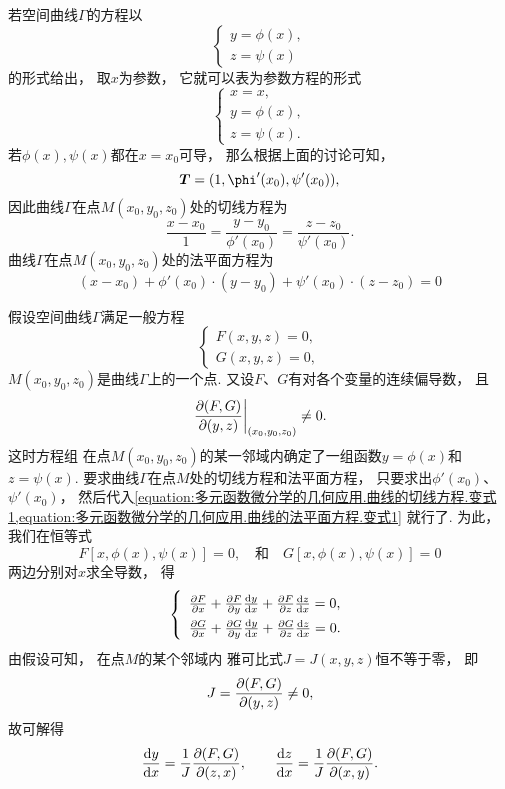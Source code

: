 若空间曲线\(\Gamma\)的方程以\[
	\left\{ \begin{array}{l}
		y = \phi(x), \\
		z = \psi(x)
	\end{array} \right.
\]的形式给出，
取\(x\)为参数，
它就可以表为参数方程的形式\[
	\left\{ \begin{array}{l}
		x = x, \\
		y = \phi(x), \\
		z = \psi(x).
	\end{array} \right.
\]
若\(\phi(x),\psi(x)\)都在\(x=x_0\)可导，
那么根据上面的讨论可知，\[
	\vb{T} = (1,\phi'(x_0),\psi'(x_0)),
\]
因此曲线\(\Gamma\)在点\(M(x_0,y_0,z_0)\)处的切线方程为
\begin{equation}\label{equation:多元函数微分学的几何应用.曲线的切线方程.变式1}
	\frac{x-x_0}{1}
	=\frac{y-y_0}{\phi'(x_0)}
	=\frac{z-z_0}{\psi'(x_0)}.
\end{equation}
曲线\(\Gamma\)在点\(M(x_0,y_0,z_0)\)处的法平面方程为
\begin{equation}\label{equation:多元函数微分学的几何应用.曲线的法平面方程.变式1}
	(x-x_0) + \phi'(x_0) \cdot (y-y_0) + \psi'(x_0) \cdot (z-z_0) = 0
\end{equation}

假设空间曲线\(\Gamma\)满足一般方程 
\[
	\left\{ \begin{array}{l}
		F(x,y,z) = 0, \\
		G(x,y,z) = 0,
	\end{array} \right.
\]
\(M(x_0,y_0,z_0)\)是曲线\(\Gamma\)上的一个点.
又设\(F\)、\(G\)有对各个变量的连续偏导数，
且\[
	\eval{\jacobi{F,G}{y,z}}_{(x_0,y_0,z_0)} \neq 0.
\]
这时方程组 
在点\(M(x_0,y_0,z_0)\)的某一邻域内确定了一组函数\(y=\phi(x)\)和\(z=\psi(x)\).
要求曲线\(\Gamma\)在点\(M\)处的切线方程和法平面方程，
只要求出\(\phi'(x_0)\)、\(\psi'(x_0)\)，
然后代入\cref{equation:多元函数微分学的几何应用.曲线的切线方程.变式1,equation:多元函数微分学的几何应用.曲线的法平面方程.变式1} 就行了.
为此，我们在恒等式\[
	F[x,\phi(x),\psi(x)] = 0,
	\quad\text{和}\quad
	G[x,\phi(x),\psi(x)] = 0
\]两边分别对\(x\)求全导数，
得\[
	\left\{ \def\arraystretch{1.5} \begin{array}{l}
		\pdv{F}{x} + \pdv{F}{y} \dv{y}{x} + \pdv{F}{z} \dv{z}{x} = 0, \\
		\pdv{G}{x} + \pdv{G}{y} \dv{y}{x} + \pdv{G}{z} \dv{z}{x} = 0.
	\end{array} \right.
\]
由假设可知，
在点\(M\)的某个邻域内
雅可比式\(J=J(x,y,z)\)恒不等于零，
即\[
	J = \pdv{ (F,G) }{ (y,z) } \neq 0,
\]
故可解得\[
	\dv{y}{x} = \frac{1}{J} \pdv{ (F,G) }{ (z,x) },
	\qquad
	\dv{z}{x} = \frac{1}{J} \pdv{ (F,G) }{ (x,y) }.
\]

